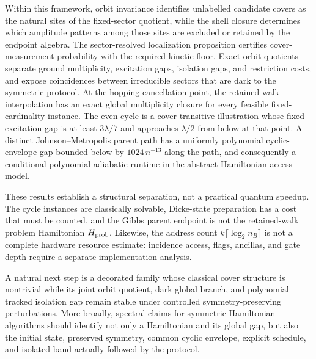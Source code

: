 Within this framework, orbit invariance identifies unlabelled candidate
covers as the natural sites of the fixed-sector quotient, while the shell
closure determines which amplitude patterns among those sites are excluded
or retained by the endpoint algebra.  The sector-resolved localization
proposition
certifies cover-measurement probability with the required kinetic floor.
Exact orbit quotients separate ground multiplicity, excitation gaps,
isolation gaps, and restriction costs, and expose coincidences between
irreducible sectors that are dark to the symmetric protocol.  At the
hopping-cancellation point, the retained-walk interpolation has an exact global
multiplicity closure for every feasible fixed-cardinality instance.  The
even cycle is a cover-transitive illustration whose fixed excitation gap is
at least $3\lambda/7$ and approaches $\lambda/2$ from below at that point.
A distinct Johnson--Metropolis parent
path has a uniformly polynomial cyclic-envelope gap bounded below by
$1024\,n^{-13}$ along the path, and consequently a
conditional polynomial adiabatic runtime in the abstract
Hamiltonian-access model.

These results establish a structural separation, not a practical quantum
speedup.  The cycle instances are classically solvable, Dicke-state
preparation has a cost that must be counted, and the Gibbs parent endpoint is
not the retained-walk problem Hamiltonian $H_{\rm prob}$.  Likewise, the address count
$k\lceil\log_2n_B\rceil$ is not a complete hardware resource estimate:
incidence access, flags, ancillas, and gate depth require a separate
implementation analysis.

A natural next step is a decorated family whose classical cover structure
is nontrivial while its joint orbit quotient, dark global branch, and
polynomial tracked isolation gap remain stable under controlled
symmetry-preserving perturbations.  More broadly, spectral claims for
symmetric Hamiltonian algorithms should identify not only a Hamiltonian and
its global gap, but also the initial state, preserved symmetry, common cyclic
envelope, explicit schedule, and isolated band actually followed by the
protocol.
